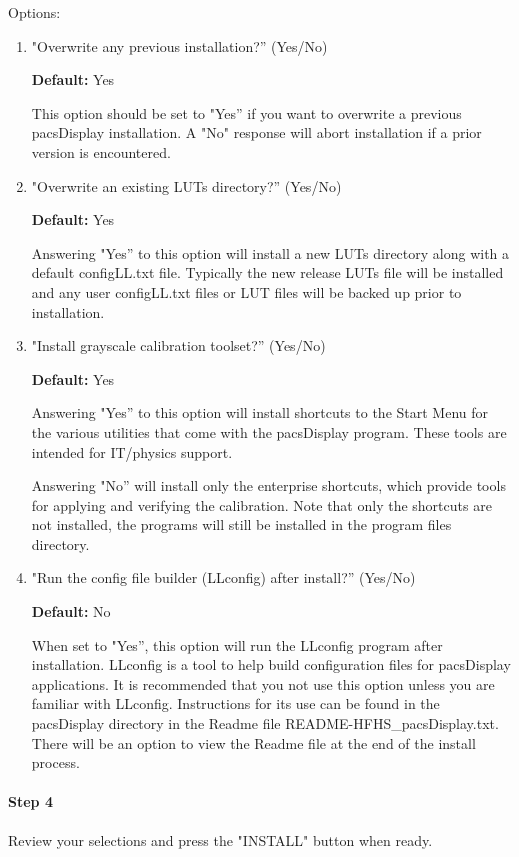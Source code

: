 Options:
\begin{enumerate}
\item "Overwrite any previous installation?'' (Yes/No)

\textbf{Default:} Yes

This option should be set to "Yes'' if you want to overwrite a previous pacsDisplay installation. A "No" response will abort installation if a prior version is encountered.

\item "Overwrite an existing LUTs directory?'' (Yes/No)

\textbf{Default:} Yes

Answering "Yes'' to this option will install a new LUTs directory along with a default \textnormal{configLL.txt} file. Typically the new release LUTs file will be installed and any user \textnormal{configLL.txt} files or LUT files will be backed up prior to installation.

\item "Install grayscale calibration toolset?'' (Yes/No)

\textbf{Default:} Yes

Answering "Yes'' to this option will install shortcuts to the Start Menu for the various utilities that come with the pacsDisplay program. These tools are intended for IT/physics support.

Answering "No'' will install only the enterprise shortcuts, which provide tools for applying and verifying the calibration. Note that only the shortcuts are not installed, the programs will still be installed in the program files directory.

\item "Run the config file builder (LLconfig) after install?'' (Yes/No)

\textbf{Default:} No

When set to "Yes'', this option will run the LLconfig program after installation. LLconfig is a tool to help build configuration files for pacsDisplay applications. It is recommended that you not use this option unless you are familiar with LLconfig. Instructions for its use can be found in the pacsDisplay directory in the Readme file \textnormal{README-HFHS\_pacsDisplay.txt}. There will be an option to view the Readme file at the end of the install process.
\end{enumerate}

\paragraph{Step 4} Review your selections and press the "INSTALL" button when ready.

